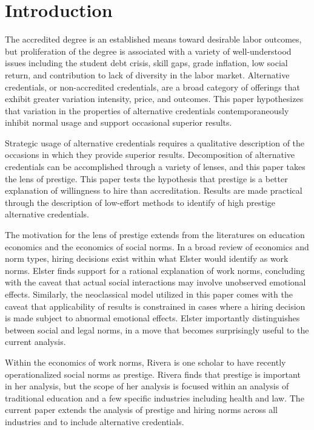 \documentclass[review]{elsarticle}
\begin{document}
\pagebreak
\linenumbers

\section{Introduction}

The accredited degree is an established means toward desirable labor outcomes,
but proliferation of the degree is associated with a variety of well-understood issues including
the student debt crisis, skill gaps, grade inflation, low social return,
and contribution to lack of diversity in the labor market.
Alternative credentials, or non-accredited credentials,
are a broad category of offerings that exhibit greater variation intensity, price, and outcomes.
This paper hypothesizes that variation in the properties of alternative credentials
contemporaneously inhibit normal usage and support occasional superior results.

Strategic usage of alternative credentials requires a qualitative description of the occasions in which they provide superior results.
Decomposition of alternative credentials can be accomplished through a variety of lenses,
and this paper takes the lens of prestige.
This paper tests the hypothesis that prestige is a better explanation of willingness to hire
than accreditation.
Results are made practical through the description of low-effort methods to identify of high prestige alternative credentials.

The motivation for the lens of prestige extends from the literatures on education economics and the economics of social norms.
In a broad review of economics and norm types, hiring decisions exist within what Elster would identify as work norms\cite{elster1989social}.
Elster finds support for a rational explanation of work norms, concluding with the caveat that actual social interactions may involve unobserved emotional effects.
Similarly, the neoclassical model utilized in this paper comes with the caveat that
applicability of results is constrained in cases where a hiring decision is made subject to abnormal emotional effects.
Elster importantly distinguishes between social and legal norms, in a move that becomes surprisingly useful to the current analysis.

Within the economics of work norms, Rivera is one scholar to have recently operationalized social norms as prestige\cite{rivera2016pedigree}.
Rivera finds that prestige is important in her analysis, but the scope of her analysis is focused
within an analysis of traditional education and a few specific industries including health and law.
The current paper extends the analysis of prestige and hiring norms
across all industries and to include alternative credentials.
\end{document}
